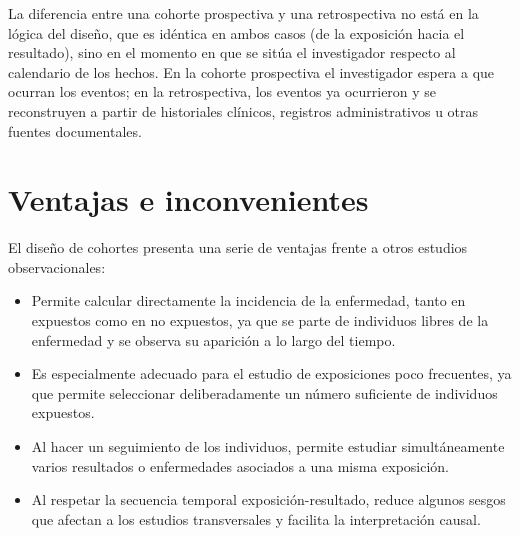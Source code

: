 \documentclass[
  spanish,
  a4paper,
]{scrreport}
\providecommand{\tightlist}{%
  \setlength{\itemsep}{0pt}\setlength{\parskip}{0pt}}
\theoremstyle{definition}
\theoremstyle{definition}
\theoremstyle{remark}
\begin{document}
\begin{tcolorbox}[enhanced jigsaw, arc=.35mm, bottomrule=.15mm, bottomtitle=1mm, breakable, colback=white, colbacktitle=quarto-callout-note-color!10!white, colframe=quarto-callout-note-color-frame, coltitle=black, left=2mm, leftrule=.75mm, opacityback=0, opacitybacktitle=0.6, rightrule=.15mm, title=\textcolor{quarto-callout-note-color}{\faInfo}\hspace{0.5em}{Interpretación}, titlerule=0mm, toprule=.15mm, toptitle=1mm]

La diferencia entre una cohorte prospectiva y una retrospectiva no está
en la lógica del diseño, que es idéntica en ambos casos (de la
exposición hacia el resultado), sino en el momento en que se sitúa el
investigador respecto al calendario de los hechos. En la cohorte
prospectiva el investigador espera a que ocurran los eventos; en la
retrospectiva, los eventos ya ocurrieron y se reconstruyen a partir de
historiales clínicos, registros administrativos u otras fuentes
documentales.

\end{tcolorbox}

\section{Ventajas e inconvenientes}\label{ventajas-e-inconvenientes-2}

El diseño de cohortes presenta una serie de ventajas frente a otros
estudios observacionales:

\begin{itemize}
\tightlist
\item
  Permite calcular directamente la incidencia de la enfermedad, tanto en
  expuestos como en no expuestos, ya que se parte de individuos libres
  de la enfermedad y se observa su aparición a lo largo del tiempo.
\item
  Es especialmente adecuado para el estudio de exposiciones poco
  frecuentes, ya que permite seleccionar deliberadamente un número
  suficiente de individuos expuestos.
\item
  Al hacer un seguimiento de los individuos, permite estudiar
  simultáneamente varios resultados o enfermedades asociados a una misma
  exposición.
\item
  Al respetar la secuencia temporal exposición-resultado, reduce algunos
  sesgos que afectan a los estudios transversales y facilita la
  interpretación causal.
\end{itemize}
\end{document}
